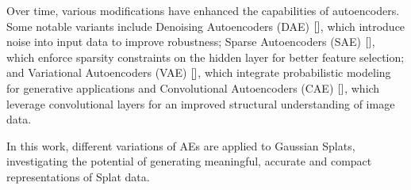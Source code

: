 Over time, various modifications have enhanced the capabilities of autoencoders. Some notable variants include Denoising Autoencoders (DAE) $\cite{}$, which introduce noise into input data to improve robustness; Sparse Autoencoders (SAE) $\cite{}$, which enforce sparsity constraints on the hidden layer for better feature selection; and Variational Autoencoders (VAE) $\cite{}$, which integrate probabilistic modeling for generative applications and Convolutional Autoencoders (CAE) $\cite{}$, which leverage convolutional layers for an improved structural understanding of image data.

In this work, different variations of AEs are applied to Gaussian Splats, investigating the potential of generating meaningful, accurate and compact representations of Splat data.